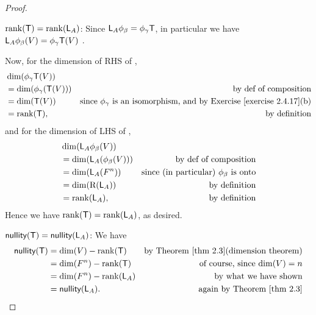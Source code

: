 \begin{proof} \ 

\(\mathrm{rank}(\textsf{T}) = \mathrm{rank}(\textsf{L}_A)\):
Since \(\textsf{L}_A \phi_{\beta} = \phi_{\gamma} \textsf{T} \), in particular we have \(\textsf{L}_A \phi_{\beta}(V) = \phi_{\gamma} \textsf{T}(V)\) .

Now, for the dimension of RHS of ,
\begin{align*}
    & \dim(\phi_{\gamma} \T(V)) \\
    & = \dim(\phi_{\gamma} (\T(V))) & \text{by def of composition} \\
    & = \dim(\T(V)) & \text{since \(\phi_{\gamma}\) is an isomorphism, and by \EXEC{2.4.17}(b)} \\
    & = \rankT, & \text{by definition}
\end{align*}
and for the dimension of LHS of ,
\begin{align*}
    & \dim(\textsf{L}_A \phi_{\beta}(V)) \\
    & = \dim(\textsf{L}_A (\phi_{\beta}(V))) & \text{by def of composition} \\
    & = \dim(\textsf{L}_A (F^n)) & \text{since (in particular) \(\phi_{\beta}\) is onto} \\
    & = \dim(\mathrm{R}(\textsf{L}_A)) & \text{by definition} \\
    & = \mathrm{rank}(\textsf{L}_A), & \text{by definition}
\end{align*}
Hence we have \(\mathrm{rank}(\textsf{T}) = \mathrm{rank}(\textsf{L}_A)\), as desired.

\(\textsf{nullity}(\textsf{T}) = \textsf{nullity}(\textsf{L}_A)\):
We have
\begin{align*}
    \nullityT & = \dim(V) - \rankT & \text{by \THM{2.3}(dimension theorem)} \\
              & = \dim(F^n) - \rankT & \text{of course, since \(\dim(V) = n\)} \\
              & = \dim(F^n) - \rank(\LMTRAN_A) & \text{by what we have shown} \\
              & = \nullity(\LMTRAN_A). & \text{again by \THM{2.3}}
\end{align*}
\end{proof}

